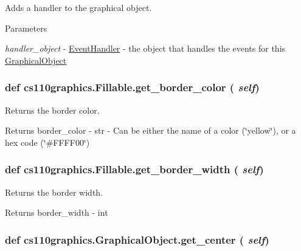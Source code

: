 Adds a handler to the graphical object. 
\begin{DoxyParams}{Parameters}
\item[{\em handler\_\-object}]-\/ \hyperlink{classcs110graphics_1_1EventHandler}{EventHandler} -\/ the object that handles the events for this \hyperlink{classcs110graphics_1_1GraphicalObject}{GraphicalObject} \end{DoxyParams}
\hypertarget{classcs110graphics_1_1Fillable_a6772d56158c9fe98a33f01d47cb8aa41}{
\subsubsection[{get\_\-border\_\-color}]{\setlength{\rightskip}{0pt plus 5cm}def cs110graphics.Fillable.get\_\-border\_\-color ( {\em self})}}
\label{classcs110graphics_1_1Fillable_a6772d56158c9fe98a33f01d47cb8aa41}


Returns the border color. \begin{DoxyReturn}{Returns}
border\_\-color -\/ str -\/ Can be either the name of a color (\char`\"{}yellow\char`\"{}), or a hex code (\char`\"{}\#FFFF00\char`\"{}) 
\end{DoxyReturn}
\hypertarget{classcs110graphics_1_1Fillable_a6ed7a4288e84a090ec185c8bdff21d0f}{
\subsubsection[{get\_\-border\_\-width}]{\setlength{\rightskip}{0pt plus 5cm}def cs110graphics.Fillable.get\_\-border\_\-width ( {\em self})}}
\label{classcs110graphics_1_1Fillable_a6ed7a4288e84a090ec185c8bdff21d0f}


Returns the border width. \begin{DoxyReturn}{Returns}
border\_\-width -\/ int 
\end{DoxyReturn}
\hypertarget{classcs110graphics_1_1GraphicalObject_a062789c4cc9de38af32dcc4ff2058607}{
\subsubsection[{get\_\-center}]{\setlength{\rightskip}{0pt plus 5cm}def cs110graphics.GraphicalObject.get\_\-center ( {\em self})}}
\label{classcs110graphics_1_1GraphicalObject_a062789c4cc9de38af32dcc4ff2058607}


